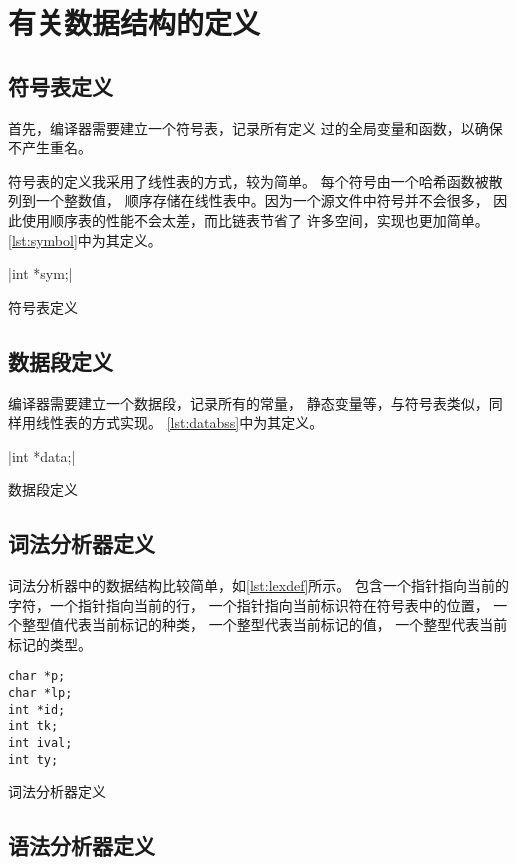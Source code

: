 \section{有关数据结构的定义}

\subsection{符号表定义}

首先，编译器需要建立一个符号表，记录所有定义
过的全局变量和函数，以确保不产生重名。

符号表的定义我采用了线性表的方式，较为简单。
每个符号由一个哈希函数被散列到一个整数值，
顺序存储在线性表中。因为一个源文件中符号并不会很多，
因此使用顺序表的性能不会太差，而比链表节省了
许多空间，实现也更加简单。\autoref{lst:symbol}中为其定义。

\begin{listing}[hbt]
	|int *sym;|
	\caption{符号表定义}\label{lst:symbol}
\end{listing}

\subsection{数据段定义}

编译器需要建立一个数据段，记录所有的常量，
静态变量等，与符号表类似，同样用线性表的方式实现。
\autoref{lst:databss}中为其定义。

\begin{listing}[hbt]
	|int *data;|
	\caption{数据段定义}\label{lst:databss}
\end{listing}

\subsection{词法分析器定义}

词法分析器中的数据结构比较简单，如\autoref{lst:lexdef}所示。
包含一个指针指向当前的字符，一个指针指向当前的行，
一个指针指向当前标识符在符号表中的位置，
一个整型值代表当前标记的种类，
一个整型代表当前标记的值，
一个整型代表当前标记的类型。

\begin{listing}[hbt]
	\begin{verbatim}
char *p;
char *lp;
int *id;
int tk;
int ival;
int ty;
\end{verbatim}
	\caption{词法分析器定义}\label{lst:lexdef}
\end{listing}

\subsection{语法分析器定义}

